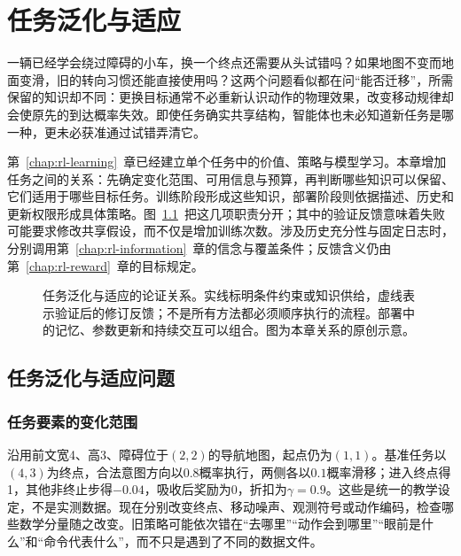 \chapter{任务泛化与适应}
\label{chap:rl-transfer}

一辆已经学会绕过障碍的小车，换一个终点还需要从头试错吗？如果地图不变而地面变滑，旧的转向习惯还能直接使用吗？这两个问题看似都在问“能否迁移”，所需保留的知识却不同：更换目标通常不必重新认识动作的物理效果，改变移动规律却会使原先的到达概率失效。即使任务确实共享结构，智能体也未必知道新任务是哪一种，更未必获准通过试错弄清它。

第~\ref{chap:rl-learning}~章已经建立单个任务中的价值、策略与模型学习。本章增加任务之间的关系：先确定变化范围、可用信息与预算，再判断哪些知识可以保留、它们适用于哪些目标任务。训练阶段形成这些知识，部署阶段则依据描述、历史和更新权限形成具体策略。图~\ref{fig:rl-transfer-map}~把这几项职责分开；其中的验证反馈意味着失败可能要求修改共享假设，而不仅是增加训练次数。涉及历史充分性与固定日志时，分别调用第~\ref{chap:rl-information}~章的信念与覆盖条件；反馈含义仍由第~\ref{chap:rl-reward}~章的目标规定。

\begin{figure}[t]
  \centering
  
  \caption{任务泛化与适应的论证关系。实线标明条件约束或知识供给，虚线表示验证后的修订反馈；不是所有方法都必须顺序执行的流程。部署中的记忆、参数更新和持续交互可以组合。图为本章关系的原创示意。}
  \label{fig:rl-transfer-map}
\end{figure}

\section{任务泛化与适应问题}
\label{sec:rl-transfer-problem}

\subsection{任务要素的变化范围}
\label{sec:rl-transfer-components}

沿用前文宽4、高3、障碍位于$(2,2)$的导航地图，起点仍为$(1,1)$。基准任务以$(4,3)$为终点，合法意图方向以$0.8$概率执行，两侧各以$0.1$概率滑移；进入终点得1，其他非终止步得$-0.04$，吸收后奖励为0，折扣为$\gamma=0.9$。这些是统一的教学设定，不是实测数据。现在分别改变终点、移动噪声、观测符号或动作编码，检查哪些数学分量随之改变。旧策略可能依次错在“去哪里”“动作会到哪里”“眼前是什么”和“命令代表什么”，而不只是遇到了不同的数据文件。

